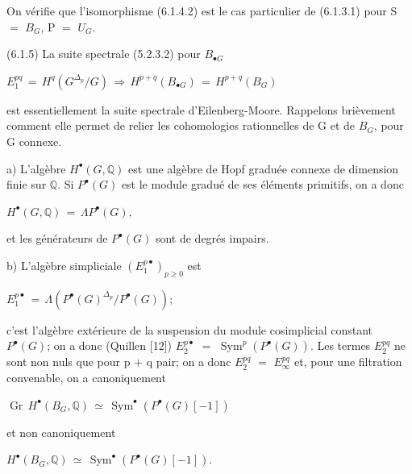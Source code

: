 \documentclass[11pt,twoside]{article}
\newcommand{\DFormula}[1]{%
  \par\smallskip\noindent\hspace*{0pt}\(\displaystyle #1\)\par\smallskip
}
\begin{document}
On vérifie que l’isomorphisme (6.1.4.2) est le cas particulier de (6.1.3.1) pour S \(=\) \(B_{G}\), P \(=\) \(U_{G}\).\par
\par\medskip
(6.1.5) La suite spectrale (5.2.3.2) pour \(B_{\bullet G}\)\par
\par\medskip
\DFormula{E_{1}^{pq}\,=\,H^{q}(G^{\Delta _{p}}/G)\,\Rightarrow \,H^{p+q}(B_{\bullet G})\,=\,H^{p+q}(B_{G})}
\par\medskip
est essentiellement la suite spectrale d’Eilenberg-Moore. Rappelons brièvement comment elle permet de relier les cohomologies rationnelles de G et de \(B_{G}\), pour G connexe.\par
\par\medskip
a) L’algèbre \(H^{\bullet }(G,\mathbb{Q})\) est une algèbre de Hopf graduée connexe de dimension finie sur \(\mathbb{Q}\). Si \(P^{\bullet }(G)\) est le module gradué de ses éléments primitifs, on a donc\par
\par\medskip
\DFormula{H^{\bullet }(G,\mathbb{Q})\,=\,\Lambda P^{\bullet }(G),}
\par\medskip
et les générateurs de \(P^{\bullet }(G)\) sont de degrés impairs.\par
\par\medskip
b) L’algèbre simpliciale \((E_{1}^{p\bullet })_{p\geq 0}\) est\par
\par\medskip
\DFormula{E_{1}^{p\bullet }\,=\,\Lambda (P^{\bullet }(G)^{\Delta _{p}}/P^{\bullet }(G));}
\par\medskip
c’est l’algèbre extérieure de la suspension du module cosimplicial constant \(P^{\bullet }(G)\); on a donc (Quillen [12]) \(E_{2}^{p\bullet }\) \(=\) \(\operatorname{Sym}^{p}(P^{\bullet }(G))\). Les termes \(E_{2}^{pq}\) ne sont non nuls que pour p \(+\) q pair; on a donc \(E_{2}^{pq}\) \(=\) \(E_{\infty }^{pq}\) et, pour une filtration convenable, on a canoniquement\par
\par\medskip
\DFormula{\operatorname{Gr}\,H^{\bullet }(B_{G},\mathbb{Q})\,\simeq \,\operatorname{Sym}^{\bullet }(P^{\bullet }(G)[−1])}
\par\medskip
et non canoniquement\par
\par\medskip
\DFormula{H^{\bullet }(B_{G},\mathbb{Q})\,\simeq \,\operatorname{Sym}^{\bullet }(P^{\bullet }(G)[−1]).}
\par\medskip
\end{document}
